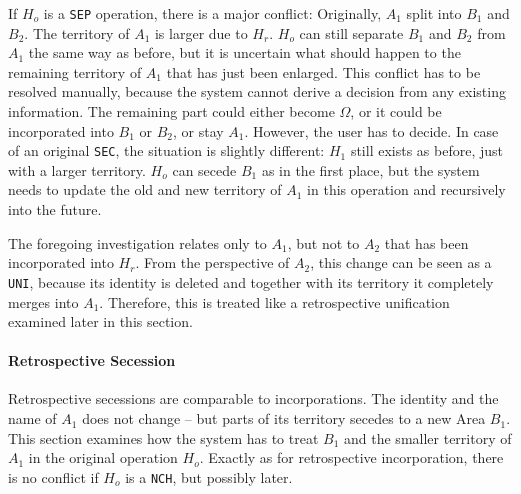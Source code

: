 If $H_o$ is a \texttt{SEP} operation, there is a major conflict: Originally, $A_1$ split into $B_1$ and $B_2$. The territory of $A_1$ is larger due to $H_r$. $H_o$ can still separate $B_1$ and $B_2$ from $A_1$ the same way as before, but it is uncertain what should happen to the remaining territory of $A_1$ that has just been enlarged. This conflict has to be resolved manually, because the system cannot derive a decision from any existing information. The remaining part could either become $\Omega$, or it could be incorporated into $B_1$ or $B_2$, or stay $A_1$. However, the user has to decide. In case of an original \texttt{SEC}, the situation is slightly different: $H_1$ still exists as before, just with a larger territory. $H_o$ can secede $B_1$ as in the first place, but the system needs to update the old and new territory of $A_1$ in this operation and recursively into the future.

The foregoing investigation relates only to $A_1$, but not to $A_2$ that has been incorporated into $H_r$. From the perspective of $A_2$, this change can be seen as a \texttt{UNI}, because its identity is deleted and together with its territory it completely merges into $A_1$. Therefore, this is treated like a retrospective unification examined later in this section.


\paragraph{Retrospective Secession} %
\label{par:retrospective_secession}

Retrospective secessions are comparable to incorporations. The identity and the name of $A_1$ does not change -- but parts of its territory secedes to a new Area $B_1$. This section examines how the system has to treat $B_1$ and the smaller territory of $A_1$ in the original operation $H_o$. Exactly as for retrospective incorporation, there is no conflict if $H_o$ is a \texttt{NCH}, but possibly later.

